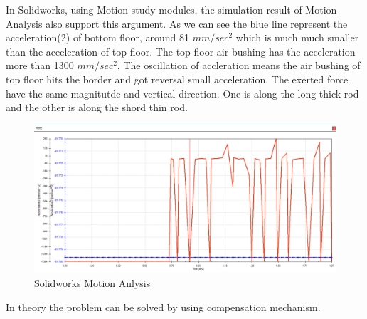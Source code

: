 In Solidworks, using Motion study modules, the simulation result of Motion Analysis also support this argument. As we can see the blue line represent the acceleration(2) of bottom floor, around 81 $mm/sec^2$ which is much much smaller than the aceeleration of top floor. The top floor air bushing has the acceleration more than 1300 $mm/sec^2$. The oscillation of accleration means the air bushing of top floor hits the border and got reversal small acceleration. The exerted force have the same magnitutde and vertical direction. One is along the long thick rod and the other is along the shord thin rod.   
\begin{figure}[!h]
\centering
\includegraphics[width=0.5\linewidth]{fig/DOE/MotionAnalysis}
\caption{Solidworks Motion Anlysis} 
\end{figure} 

In theory the problem can be solved by using compensation mechanism.





\newpage
